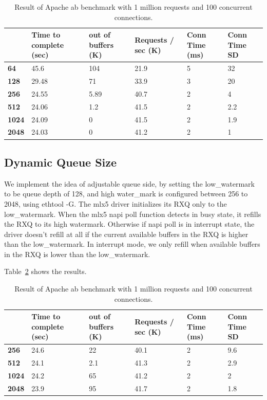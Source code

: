 \documentclass[letterpaper]{article}
\begin{document}
\begin{table}[h!]
\centering
\footnotesize
\begin{tabular}{|p{0.6cm}|p{1.2cm}|p{1.2cm}|p{1.2cm}|p{0.8cm}|p{1cm}|} \hline
\textbf{} & \textbf{Time to complete (sec)} & \textbf{out of buffers (K)} & \textbf{Requests / sec (K)} & \textbf{Conn Time (ms)} & \textbf{Conn Time SD} \\ \hline \hline
\textbf{64}   & 45.6  & 104   & 21.9 & 5 & 32  \\ \hline
\textbf{128}  & 29.48 & 71    & 33.9 & 3 & 20  \\ \hline \hline
\textbf{256}  & 24.55 & 5.89  & 40.7 & 2 & 4   \\ \hline
\textbf{512}  & 24.06 & 1.2   & 41.5 & 2 & 2.2 \\ \hline
\textbf{1024} & 24.09 & 0     & 41.5 & 2 & 1.9 \\ \hline
\textbf{2048} & 24.03 & 0     & 41.2 & 2 & 1   \\ \hline
\end{tabular}
\caption{Result of Apache ab benchmark with 1 million requests and 100 concurrent connections.}
\label{tab:ab1}
\end{table}


\subsection{Dynamic Queue Size}
We implement the idea of adjustable queue side, by setting the low\_watermark to
be queue depth of 128, and high water\_mark is configured between 256 to 2048, using
ethtool -G. The mlx5 driver initializes its RXQ only to the low\_watermark.
When the mlx5 napi poll function detects in busy state, it refills the
RXQ to its high watermark. Otherwise if napi poll is in interrupt state, the driver
doesn't refill at all if the current available buffers in the RXQ is higher than
the low\_watermark. In interrupt mode, we only refill when available buffers in the RXQ
is lower than the low\_watermark.

Table~\ref{tab:ab2} shows the results.
\begin{table}[h!]
\centering
\footnotesize
\begin{tabular}{|p{0.6cm}|p{1.2cm}|p{1.2cm}|p{1.2cm}|p{0.8cm}|p{1cm}|} \hline
\textbf{} & \textbf{Time to complete (sec)} & \textbf{out of buffers (K)} & \textbf{Requests / sec (K)} & \textbf{Conn Time (ms)} & \textbf{Conn Time SD} \\ \hline \hline
\textbf{256}  & 24.6  & 22   & 40.1 & 2 & 9.6 \\ \hline
\textbf{512}  & 24.1  & 2.1  & 41.3 & 2 & 2.9 \\ \hline
\textbf{1024} & 24.2  & 65   & 41.2 & 2 & 2   \\ \hline
\textbf{2048} & 23.9  & 95   & 41.7 & 2 & 1.8 \\ \hline
\end{tabular}
\caption{Result of Apache ab benchmark with 1 million requests and 100 concurrent connections.}
\label{tab:ab2}
\end{table}
\end{document}
